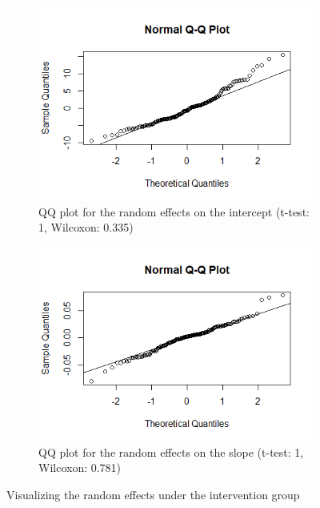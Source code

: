 \begin{figure}[H]
\begin{subfigure}{.5\textwidth}
  \centering
  \includegraphics[width=1\linewidth]{../../plots/qq_intercept_treatment.png}
  \caption{QQ plot for the random effects on the intercept (t-test: 1, Wilcoxon: 0.335)}
\end{subfigure}
\begin{subfigure}{.5\textwidth}
  \centering
  \includegraphics[width=1\linewidth]{../../plots/qq_slope_treatment.png}
  \caption{QQ plot for the random effects on the slope (t-test: 1, Wilcoxon: 0.781)}
\end{subfigure}
\caption{Visualizing the random effects under the intervention group}
\label{fig:re.treatment}
\end{figure}

